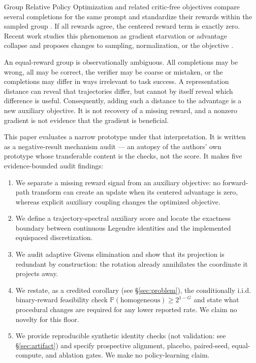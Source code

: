 \documentclass{article}
\newcommand{\Prob}{\mathbb{P}}
\begin{document}
Group Relative Policy Optimization and related critic-free objectives compare
several completions for the same prompt and standardize their rewards within
the sampled group \citep{shao2024deepseekmath}.  If all rewards agree, the
centered reward term is exactly zero.  Recent work studies this phenomenon as
gradient starvation or advantage collapse and proposes changes to sampling,
normalization, or the objective \citep{nie2026gradient,he2026advantage}.

An equal-reward group is observationally ambiguous.  All completions may be
wrong, all may be correct, the verifier may be coarse or mistaken, or the
completions may differ in ways irrelevant to task success.  A representation
distance can reveal that trajectories differ, but cannot by itself reveal
which difference is useful.  Consequently, adding such a distance to the
advantage is a new auxiliary objective.  It is not recovery of a missing
reward, and a nonzero gradient is not evidence that the gradient is beneficial.

This paper evaluates a narrow prototype under that interpretation. It is
written as a negative-result mechanism audit --- an autopsy of the authors'
own prototype whose transferable content is the checks, not the score.
It makes five evidence-bounded audit findings:

\begin{enumerate}[leftmargin=*,itemsep=2pt]
  \item We separate a missing reward signal from an auxiliary objective: no
  forward-path transform can create an update when its centered advantage is
  zero, whereas explicit auxiliary coupling changes the optimized objective.
  \item We define a trajectory-spectral auxiliary score and locate the
  exactness boundary between continuous Legendre identities and the implemented
  equispaced discretization.
  \item We audit adaptive Givens elimination and show that its projection is
  redundant by construction: the rotation already annihilates the coordinate
  it projects away.
  \item We restate, as a credited corollary (see \S\ref{sec:problem}), the conditionally
  i.i.d. binary-reward feasibility check
  $\Prob(\text{homogeneous})\geq 2^{1-G}$ and state what procedural changes are
  required for any lower reported rate. We claim no novelty for this floor.
  \item We provide reproducible synthetic identity checks (not validation:
  see \S\ref{sec:artifact}) and specify prospective alignment, placebo, paired-seed,
  equal-compute, and ablation gates. We make no policy-learning claim.
\end{enumerate}
\end{document}
